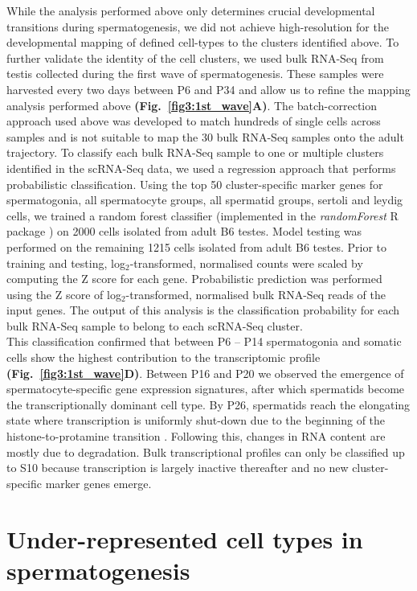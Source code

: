 While the analysis performed above only determines crucial developmental transitions during spermatogenesis, we did not achieve high-resolution for the developmental mapping of defined cell-types to the clusters identified above. To further validate the identity of the cell clusters, we used bulk RNA-Seq from testis collected during the first wave of spermatogenesis. These samples were harvested every two days between P6 and P34 and allow us to refine the mapping analysis performed above \textbf{(Fig.~\ref{fig3:1st_wave}A)}. The batch-correction approach used above was developed to match hundreds of single cells across samples and is not suitable to map the 30 bulk RNA-Seq samples onto the adult trajectory. To classify each bulk RNA-Seq sample to one or multiple clusters identified in the scRNA-Seq data, we used a regression approach that performs probabilistic classification. Using the top 50 cluster-specific marker genes for spermatogonia, all spermatocyte groups, all spermatid groups, sertoli and leydig cells, we trained a random forest classifier (implemented in the \emph{randomForest} R package \citep{Liaw2002}) on 2000 cells isolated from adult B6 testes. Model testing was performed on the remaining 1215 cells isolated from adult B6 testes. Prior to training and testing, log$_2$-transformed, normalised counts were scaled by computing the Z score for each gene. Probabilistic prediction was performed using the Z score of log$_2$-transformed, normalised bulk RNA-Seq reads of the input genes. The output of this analysis is the classification probability for each bulk RNA-Seq sample to belong to each scRNA-Seq cluster.\\

This classification confirmed that between P6 – P14 spermatogonia and somatic cells show the highest contribution to the transcriptomic profile \textbf{(Fig.~\ref{fig3:1st_wave}D)}. Between P16 and P20 we observed the emergence of spermatocyte-specific gene expression signatures, after which spermatids become the transcriptionally dominant cell type. By P26, spermatids reach the elongating state where transcription is uniformly shut-down due to the beginning of the histone-to-protamine transition \citep{Steger1999}. Following this, changes in RNA content are mostly due to degradation. Bulk transcriptional profiles can only be classified up to S10 because transcription is largely inactive thereafter and no new cluster-specific marker genes emerge.  

\newpage

\section{Under-represented cell types in spermatogenesis}

